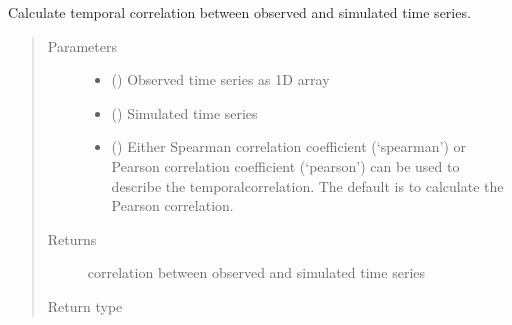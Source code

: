 \documentclass[letterpaper,10pt,english]{sphinxmanual}
\begin{document}
\begin{fulllineitems}
\label{\detokenize{reference/kge:de.kge.calc_temp_cor}}
Calculate temporal correlation between observed and simulated
time series.
\begin{quote}\begin{description}
\item[{Parameters}] \leavevmode\begin{itemize}
\item {} 
 (\sphinxstyleliteralemphasis{\sphinxupquote{(}}\sphinxstyleliteralemphasis{\sphinxupquote{,}}\sphinxstyleliteralemphasis{\sphinxupquote{)}}) \textendash{} Observed time series as 1\sphinxhyphen{}D array

\item {} 
 (\sphinxstyleliteralemphasis{\sphinxupquote{(}}\sphinxstyleliteralemphasis{\sphinxupquote{,}}\sphinxstyleliteralemphasis{\sphinxupquote{)}}) \textendash{} Simulated time series

\item {} 
 (\sphinxstyleliteralemphasis{\sphinxupquote{, }}) \textendash{} Either Spearman correlation coefficient (‘spearman’) or Pearson
correlation coefficient (‘pearson’) can be used to describe the
temporalcorrelation. The default is to calculate the Pearson
correlation.

\end{itemize}

\item[{Returns}] \leavevmode
{} \textendash{} correlation between observed and simulated time series

\item[{Return type}] \leavevmode
{}

\end{description}\end{quote}

\end{fulllineitems}
\end{document}
